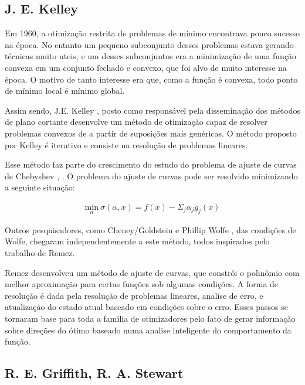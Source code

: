 \subsection{J. E. Kelley}

Em 1960, a otimização restrita de problemas de mínimo encontrava pouco sucesso na época. No
entanto um pequeno subconjunto desses problemas estava gerando técnicas muito uteis, e um desses
subconjuntos era a minimização de uma função convexa em um conjunto fechado e convexo, que foi
alvo de muito interesse na época. O motivo de tanto interesse era que, como a função é convexa,
todo ponto de mínimo local é mínimo global.

Assim sendo, J.E. Kelley \cite{kelley1960cutting}, posto como responsável pela disseminação dos
métodos de plano cortante desenvolve um método de otimização capaz de resolver problemas convexos
de a partir de suposições mais genéricas. O método proposto por Kelley é iterativo e consiste na
resolução de problemas lineares.

Esse método faz parte do crescimento do estudo do problema de ajuste de curvas de Chebyshev
\cite{kelley1959computational}, \cite{kelley1958application}. O problema do ajuste de curvas pode
ser resolvido minimizando a seguinte situação:

\begin{align}
  \underset{\alpha}{\mathrm{min}}\ \sigma(\alpha, x) = f(x) - \Sigma_j \alpha_j g_j(x)
\end{align}


Outros pesquisadores, como Cheney/Goldstein \cite{cheney1959newton} e Phillip Wolfe \cite{wolfe1960rand},
das condições de Wolfe, chegaram independentemente a este método, todos inspirados pelo trabalho de Remez.

Remez \cite{remez1934procede} desenvolveu um método de ajuste de curvas, que constrói o polinômio
com melhor aproximação para certas funções sob algumas condições. A forma de resolução é dada
pela resolução de problemas lineares, analise de erro, e atualização do estado atual baseado
em condições sobre o erro. Esses passos se tornaram base para toda a família de otimizadores
pelo fato de gerar informação sobre direções do ótimo baseado numa analise inteligente do
comportamento da função.

\subsection{R. E. Griffith, R. A. Stewart}

